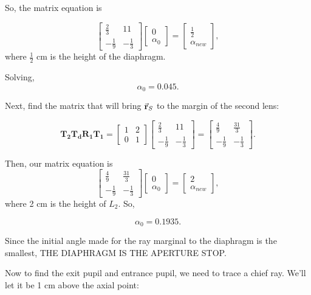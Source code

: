 \documentclass[a4paper]{article}
\begin{document}
So, the matrix equation is 

$$ \begin{bmatrix}
    \frac{2}{3} & 11\\
    - \frac{1}{9} & - \frac{1}{3}
\end{bmatrix}
\begin{bmatrix}
    0 \\
    \alpha_0
\end{bmatrix}
=
\begin{bmatrix}
    \frac{1}{2}   \\
    \alpha_{new}
\end{bmatrix},$$
where $\frac{1}{2}$ cm is the height of the diaphragm.

Solving,
$$\alpha_{0} = 0.045.$$

Next, find the matrix that will bring $\va{r}_S$ to the margin of the second lens:

$$ \bm{T_2}\bm{T_d}\bm{R_1}\bm{T_1} = 
\begin{bmatrix}
    1 & 2\\
    0 & 1
\end{bmatrix}
\begin{bmatrix}
    \frac{2}{3} & 11\\
    - \frac{1}{9} & - \frac{1}{3}
\end{bmatrix} =
\begin{bmatrix}
    \frac{4}{9} & \frac{31}{3}\\
    - \frac{1}{9} & - \frac{1}{3}
\end{bmatrix}.
$$

Then, our matrix equation is
$$
\begin{bmatrix}
    \frac{4}{9} & \frac{31}{3}\\
    - \frac{1}{9} & - \frac{1}{3}
\end{bmatrix}
\begin{bmatrix}
    0 \\
    \alpha_0
\end{bmatrix}
=
\begin{bmatrix}
    2   \\
    \alpha_{new}
\end{bmatrix},$$
where 2 cm is the height of $L_2$.
So, 

$$ \alpha_0 = 0.1935.$$

Since the initial angle made for the ray marginal to the diaphragm is the smallest, THE DIAPHRAGM IS THE APERTURE STOP.
    
Now to find the exit pupil and entrance pupil, we need to trace a chief ray. We'll let it be 1 cm above the axial point:
\end{document}
